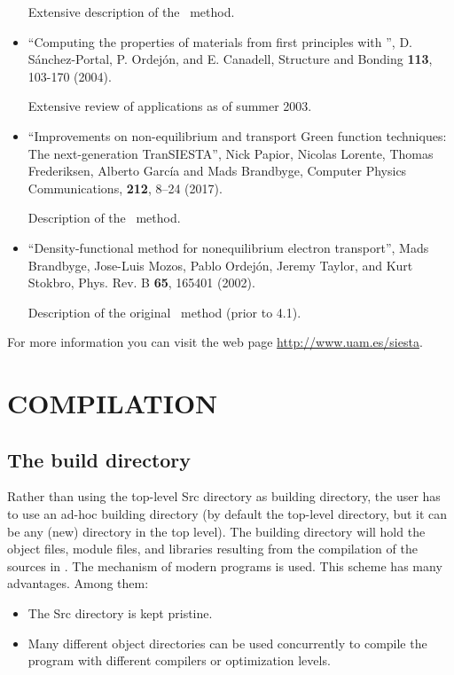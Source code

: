 \begin{itemize}
Extensive description of the \siesta\ method.

\item
``Computing the properties of materials from first principles
with  \siesta'', D. S\'anchez-Portal, P. Ordej\'on,
and E. Canadell, Structure and Bonding \textbf{113},
103-170 (2004).

Extensive review of applications as of summer 2003.

\item
 ``Improvements on non-equilibrium and transport Green function techniques: The next-generation TranSIESTA'',
 Nick Papior, Nicolas Lorente, Thomas Frederiksen, Alberto García and
 Mads Brandbyge, Computer Physics Communications, \textbf{212}, 8--24 (2017).

 Description of the \tsiesta\ method.

\item
 ``Density-functional method for nonequilibrium electron transport'',
 Mads Brandbyge, Jose-Luis Mozos, Pablo Ordej\'on, Jeremy Taylor,
 and Kurt Stokbro, Phys. Rev. B \textbf{65}, 165401 (2002).

 Description of the original \tsiesta\ method (prior to 4.1).

\end{itemize}

For more information you can visit the web page
\url{http://www.uam.es/siesta}.

\section{COMPILATION}
\label{sec:compilation}

\subsection{The build directory}

Rather than using the top-level Src directory as building directory,
the user has to use an ad-hoc building directory (by default the
top-level  directory, but it can be any (new) directory in
the top level).  The building directory will hold the object files,
module files, and libraries resulting from the compilation of the
sources in .  The  mechanism of modern 
programs is used. This scheme has many advantages. Among them:

\begin{itemize}
\item The Src directory is kept pristine.
\item Many different object directories can be used concurrently to
  compile the program with different compilers or optimization levels.
\end{itemize}

